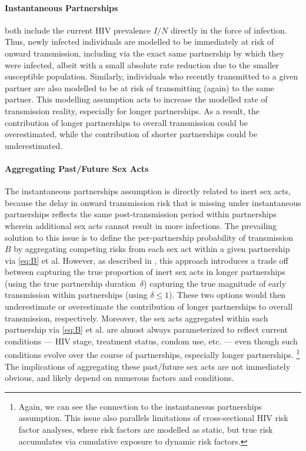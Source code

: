 \paragraph{Instantaneous Partnerships}
 both include
the current HIV prevalence $I/N$ directly in the force of infection.
Thus, newly infected individuals are modelled to be
immediately at risk of onward transmission,
including via the exact same partnership by which they were infected,
albeit with a small absolute rate reduction due to the smaller susceptible population.
Similarly, individuals who recently transmitted to a given partner are also modelled to be
at risk of transmitting (again) to the same partner.
This modelling assumption acts to increase the modelled rate of transmission \vs reality,
especially for longer partnerships.
As a result, the contribution of longer partnerships to overall transmission could be overestimated,
while the contribution of shorter partnerships could be underestimated.
\paragraph{Aggregating Past/Future Sex Acts}
The instantaneous partnerships assumption is directly related to inert sex acts,
because the delay in onward transmission risk that is missing under instantaneous partnerships
reflects the same post-transmission period within partnerships
wherein additional sex acts cannot result in more infections.
The prevailing solution to this issue is to
define the per-partnership probability of transmission $B$ by
aggregating competing risks from each sex act within a given partnership via \eqref{eq:B} et al.
However, as described in , this approach introduces a trade off between
capturing the true proportion of inert sex acts in longer partnerships
(using the true partnership duration~$\delta$)
\vs capturing the true magnitude of early transmission within partnerships (using $\delta \le 1$).
These two options would then underestimate or overestimate
the contribution of longer partnerships to overall transmission, respectively.
Moreover, the sex acts aggregated within each partnership via \eqref{eq:B} et al.
are almost always parameterized to reflect current conditions
--- \ie HIV stage, treatment status, condom use, etc. ---
even though such conditions evolve over the course of partnerships,
especially longer partnerships.%
\footnote{Again, we can see the connection to the instantaneous partnerships assumption.
  This issue also parallels limitations of cross-sectional HIV risk factor analyses,
  where risk factors are modelled as static,
  but true risk accumulates via cumulative exposure to dynamic risk factors.}
The implications of aggregating these past/future sex acts are not immediately obvious,
and likely depend on numerous factors and conditions.
